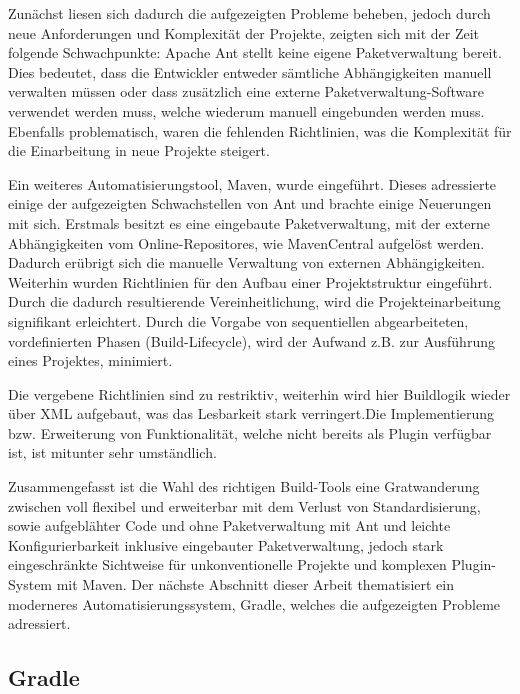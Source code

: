 Zunächst liesen sich dadurch die aufgezeigten Probleme beheben, jedoch durch neue Anforderungen und Komplexität der Projekte, zeigten sich mit der Zeit folgende Schwachpunkte:
Apache Ant stellt keine eigene Paketverwaltung bereit. Dies bedeutet, dass die Entwickler entweder sämtliche Abhängigkeiten manuell verwalten müssen oder dass zusätzlich eine externe Paketverwaltung-Software verwendet werden muss, welche wiederum manuell eingebunden werden muss.
Ebenfalls problematisch, waren die fehlenden Richtlinien, was die Komplexität für die Einarbeitung in neue Projekte steigert.

Ein weiteres Automatisierungstool, Maven, wurde eingeführt.
Dieses adressierte einige der aufgezeigten Schwachstellen von Ant und brachte einige Neuerungen mit sich.
Erstmals besitzt es eine eingebaute Paketverwaltung, mit der externe Abhängigkeiten vom Online-Repositores, wie MavenCentral aufgelöst werden. 
Dadurch erübrigt sich die manuelle Verwaltung von externen Abhängigkeiten.
Weiterhin wurden Richtlinien für den Aufbau einer Projektstruktur eingeführt.
Durch die dadurch resultierende Vereinheitlichung, wird die Projekteinarbeitung signifikant erleichtert.
Durch die Vorgabe von sequentiellen abgearbeiteten, vordefinierten Phasen (Build-Lifecycle), wird der Aufwand z.B. zur Ausführung eines Projektes, minimiert.

Die vergebene Richtlinien sind zu restriktiv, weiterhin  wird hier Buildlogik wieder über XML aufgebaut, was das Lesbarkeit stark verringert.Die Implementierung bzw. Erweiterung von Funktionalität, welche nicht bereits als Plugin verfügbar ist, ist mitunter sehr umständlich.

Zusammengefasst ist die Wahl des richtigen Build-Tools eine Gratwanderung zwischen voll flexibel und erweiterbar mit dem Verlust von Standardisierung, sowie aufgeblähter Code und ohne Paketverwaltung mit Ant und leichte Konfigurierbarkeit inklusive eingebauter Paketverwaltung, jedoch stark eingeschränkte Sichtweise für unkonventionelle Projekte und komplexen Plugin-System mit Maven. Der nächste Abschnitt dieser Arbeit thematisiert ein moderneres Automatisierungssystem, Gradle, welches die aufgezeigten Probleme adressiert. 

\subsection{Gradle}

